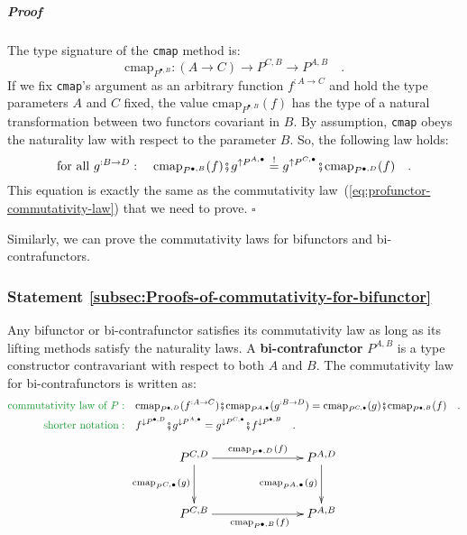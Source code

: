 \subparagraph{Proof}

The type signature of the \lstinline!cmap! method is:
\[
\text{cmap}_{P^{\bullet,B}}:(A\rightarrow C)\rightarrow P^{C,B}\rightarrow P^{A,B}\quad.
\]
If we fix \lstinline!cmap!\textsf{'}s argument as an arbitrary function $f^{:A\rightarrow C}$
and hold the type parameters $A$ and $C$ fixed, the value $\text{cmap}_{P^{\bullet,B}}(f)$
has the type of a natural transformation between two functors covariant
in $B$. By assumption, \lstinline!cmap! obeys the naturality law
with respect to the parameter $B$. So, the following law holds:
\[
\text{for all }g^{:B\rightarrow D}:\quad\text{cmap}_{P^{\bullet,B}}(f)\bef g^{\uparrow P^{A,\bullet}}\overset{!}{=}g^{\uparrow P^{C,\bullet}}\bef\text{cmap}_{P^{\bullet,D}}(f)\quad.
\]
This equation is exactly the same as the commutativity law~(\ref{eq:profunctor-commutativity-law})
that we need to prove. $\square$

Similarly, we can prove the commutativity laws for bifunctors and
bi-contrafunctors.

\subsubsection{Statement \label{subsec:Proofs-of-commutativity-for-bifunctor}\ref{subsec:Proofs-of-commutativity-for-bifunctor}}

Any bifunctor or bi-contrafunctor satisfies its commutativity law
as long as its lifting methods satisfy the naturality laws. A \textbf{bi-contrafunctor}
$P^{A,B}$ is a type constructor contravariant with respect to both
$A$ and $B$. The commutativity law for bi-contrafunctors is written
as:
\begin{align}
{\color{greenunder}\text{commutativity law of }P:}\quad & \text{cmap}_{P^{\bullet,D}}(f^{:A\rightarrow C})\bef\text{cmap}_{P^{A,\bullet}}(g^{:B\rightarrow D})=\text{cmap}_{P^{C,\bullet}}(g)\bef\text{cmap}_{P^{\bullet,B}}(f)\quad.\nonumber \\
{\color{greenunder}\text{shorter notation}:}\quad & f^{\downarrow P^{\bullet,D}}\bef g^{\downarrow P^{A,\bullet}}=g^{\downarrow P^{C,\bullet}}\bef f^{\downarrow P^{\bullet,B}}\quad.\label{eq:bi-contrafunctor-commutativity-law}
\end{align}
\[
\xymatrix{\xyScaleY{2.5pc}\xyScaleX{6.0pc}P^{C,D}\ar[r]\sp(0.55){\text{cmap}_{P^{\bullet,D}}(f)~~~}\ar[d]\sb(0.45){\text{cmap}_{P^{C,\bullet}}(g)} & P^{A,D}\ar[d]\sb(0.45){\text{cmap}_{P^{A,\bullet}}(g)}\\
P^{C,B}\ar[r]\sb(0.45){~~~~\text{cmap}_{P^{\bullet,B}}(f)} & P^{A,B}
}
\]


